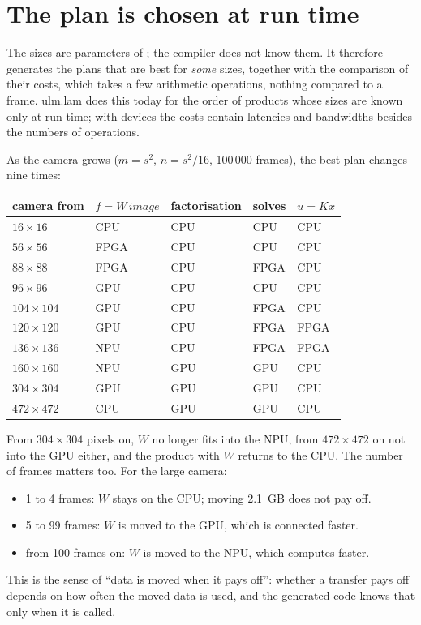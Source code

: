 \documentclass[11pt,a4paper]{article}
\let\origtexttt\texttt
\renewcommand{\texttt}[1]{\highLight[ttbg]{\origtexttt{#1}}}
\begin{document}
\section{The plan is chosen at run time}

The sizes are parameters of \texttt{fly}; the compiler does not know them.
It therefore generates the plans that are best for \emph{some} sizes,
together with the comparison of their costs, which takes a few arithmetic
operations, nothing compared to a frame. ulm.lam does this today for the
order of products whose sizes are known only at run time; with devices the
costs contain latencies and bandwidths besides the numbers of operations.

As the camera grows (\(m = s^2\), \(n = s^2/16\), 100\,000 frames), the
best plan changes nine times:

\begin{center}\small
\begin{tabular}{@{}lllll@{}}
\toprule
camera from & \(f = W\,\mathit{image}\) & factorisation & solves & \(u = Kx\) \\
\midrule
\(16\times16\)   & CPU  & CPU & CPU  & CPU \\
\(56\times56\)   & FPGA & CPU & CPU  & CPU \\
\(88\times88\)   & FPGA & CPU & FPGA & CPU \\
\(96\times96\)   & GPU  & CPU & CPU  & CPU \\
\(104\times104\) & GPU  & CPU & FPGA & CPU \\
\(120\times120\) & GPU  & CPU & FPGA & FPGA \\
\(136\times136\) & NPU  & CPU & FPGA & FPGA \\
\(160\times160\) & NPU  & GPU & GPU  & CPU \\
\(304\times304\) & GPU  & GPU & GPU  & CPU \\
\(472\times472\) & CPU  & GPU & GPU  & CPU \\
\bottomrule
\end{tabular}
\end{center}

From \(304\times304\) pixels on, \(W\) no longer fits into the NPU, from
\(472\times472\) on not into the GPU either, and the product with \(W\)
returns to the CPU. The number of frames matters too. For the large camera:
\begin{itemize}
\item 1 to 4 frames: \(W\) stays on the CPU; moving 2.1~GB does not pay off.
\item 5 to 99 frames: \(W\) is moved to the GPU, which is connected faster.
\item from 100 frames on: \(W\) is moved to the NPU, which computes faster.
\end{itemize}
This is the sense of ``data is moved when it pays off'': whether a
transfer pays off depends on how often the moved data is used, and the
generated code knows that only when it is called.
\end{document}
